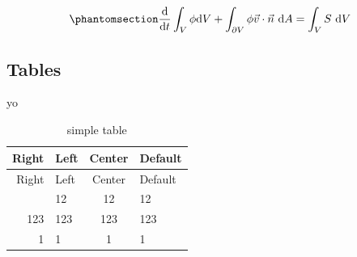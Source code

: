 \documentclass[
]{article}
\begin{document}
\begin{equation}\phantomsection\label{eq:conservation}{
\frac{\mathrm{d}}{\mathrm{d} t} \int_V \phi \mathrm{d} V+\int_{\partial V} \phi \vec{v} \cdot \vec{n} \mathrm{~d} A=\int_V S \mathrm{~d} V
}\end{equation}

\subsection{Tables}\label{tables-1}

yo

\begin{longtable}[]{@{}rlcl@{}}
\caption{\label{tbl:example}simple table}\tabularnewline
\toprule\noalign{}
Right & Left & Center & Default \\
\midrule\noalign{}
\endfirsthead
\toprule\noalign{}
Right & Left & Center & Default \\
\midrule\noalign{}
\endhead
\bottomrule\noalign{}
\endlastfoot
12 & 12 & 12 & 12 \\
123 & 123 & 123 & 123 \\
1 & 1 & 1 & 1 \\
\end{longtable}
\end{document}
